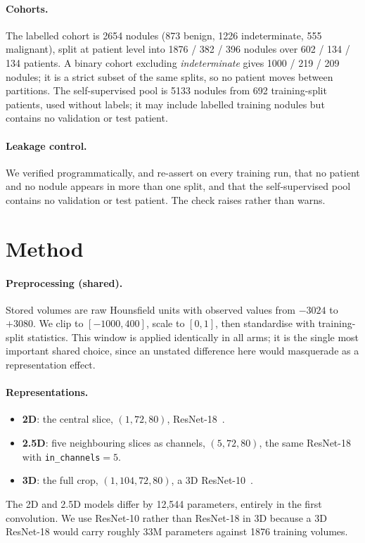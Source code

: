 \documentclass[11pt]{article}
\begin{document}
\paragraph{Cohorts.} The labelled cohort is 2654 nodules (873 benign, 1226
indeterminate, 555 malignant), split at patient level into 1876 / 382 / 396
nodules over 602 / 134 / 134 patients. A binary cohort excluding
\emph{indeterminate} gives 1000 / 219 / 209 nodules; it is a strict subset of
the same splits, so no patient moves between partitions. The self-supervised
pool is 5133 nodules from 692 training-split patients, used without labels; it
may include labelled training nodules but contains no validation or test
patient.

\paragraph{Leakage control.} We verified programmatically, and re-assert on
every training run, that no patient and no nodule appears in more than one
split, and that the self-supervised pool contains no validation or test patient.
The check raises rather than warns.

\section{Method}

\paragraph{Preprocessing (shared).} Stored volumes are raw Hounsfield units
with observed values from $-3024$ to $+3080$. We clip to $[-1000, 400]$, scale
to $[0,1]$, then standardise with training-split statistics. This window is
applied identically in all arms; it is the single most important shared choice,
since an unstated difference here would masquerade as a representation effect.

\paragraph{Representations.}
\begin{itemize}
\item \textbf{2D}: the central slice, $(1, 72, 80)$,
  ResNet-18~\citep{he2016resnet}.
\item \textbf{2.5D}: five neighbouring slices as channels, $(5, 72, 80)$,
  the same ResNet-18 with \texttt{in\_channels}$=5$.
\item \textbf{3D}: the full crop, $(1, 104, 72, 80)$, a 3D
  ResNet-10~\citep{hara2018spatiotemporal}.
\end{itemize}
The 2D and 2.5D models differ by 12{,}544 parameters, entirely in the first
convolution. We use ResNet-10 rather than ResNet-18 in 3D because a 3D
ResNet-18 would carry roughly 33M parameters against 1876 training volumes.
\end{document}
